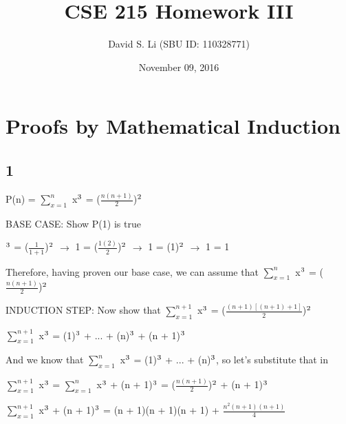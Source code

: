 \documentclass{article}
\title{CSE 215 Homework III}
\author{David S. Li (SBU ID: 110328771)}
\date{November 09, 2016}
\begin{document}
\maketitle

\section{Proofs by Mathematical Induction}

\subsection{1}

P(n) = $\sum_{x=1}^{n}$ x$\textsuperscript{3}$ = ($\frac{n(n + 1)}{2}$)$\textsuperscript{2}$ \vspace{0.5cm}

\noindent BASE CASE: Show P(1) is true \vspace{0.5cm}

$\textsuperscript{3}$ = ($\frac{1}{1 + 1}$)$\textsuperscript{2}$ $\rightarrow$ 1 = ($\frac{1(2)}{2}$)$\textsuperscript{2}$  $\rightarrow$ 1 = (1)$\textsuperscript{2}$ $\rightarrow$ 1 = 1 \vspace{0.5cm}

\noindent Therefore, having proven our base case, we can assume that $\sum_{x=1}^{n}$ x$\textsuperscript{3}$ = ($\frac{n(n + 1)}{2}$)$\textsuperscript{2}$ \vspace{0.5cm}

\noindent INDUCTION STEP: Now show that $\sum_{x=1}^{n + 1}$ x$\textsuperscript{3}$ = ($\frac{(n + 1)[(n + 1) + 1]}{2}$)$\textsuperscript{2}$ \vspace{0.5cm}

\noindent $\sum_{x=1}^{n + 1}$ x$\textsuperscript{3}$ = (1)$\textsuperscript{3}$ + ... + (n)$\textsuperscript{3}$ + (n + 1)$\textsuperscript{3}$ \vspace{0.5cm}

\noindent And we know that $\sum_{x=1}^{n}$ x$\textsuperscript{3}$ = (1)$\textsuperscript{3}$ + ... + (n)$\textsuperscript{3}$, so let's substitute that in \vspace{0.5cm}

\noindent  $\sum_{x=1}^{n + 1}$ x$\textsuperscript{3}$ = $\sum_{x=1}^{n}$ x$\textsuperscript{3}$ + (n + 1)$\textsuperscript{3}$ = ($\frac{n(n + 1)}{2}$)$\textsuperscript{2}$ + (n + 1)$\textsuperscript{3}$ \vspace{0.5cm}

\noindent  $\sum_{x=1}^{n + 1}$ x$\textsuperscript{3}$  + (n + 1)$\textsuperscript{3}$ = (n + 1)(n + 1)(n + 1) + $\frac{n^2 (n + 1)(n + 1)}{4}$ \vspace{0.5cm}
\end{document}
